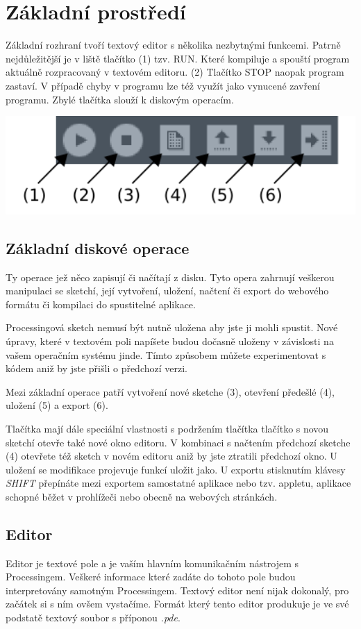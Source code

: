 \documentclass[10pt,twopage]{book}
\newcommand{\oddil}[1]{\section{#1}\label{sec:#1}}
\newcommand{\pododdil}[1]{\subsection{#1}\label{subsec:#1}}
\newcommand{\klavesy}[1]{\textsc{\em #1}}
\begin{document}
\oddil{Základní prostředí}


Základní rozhraní tvoří textový editor s několika nezbytnými funkcemi. Patrně nejdůležitější je v liště tlačítko (1) tzv. RUN. Které kompiluje a spouští program aktuálně rozpracovaný v textovém editoru. (2) Tlačítko STOP naopak program zastaví. V případě chyby v programu lze též využít jako vynucené zavření programu. Zbylé tlačítka slouží k diskovým operacím. \\


\begin{center}
\includegraphics[width = 1\textwidth]{imgs/buttons.png}
\end{center}


\newpage
\pododdil{Základní diskové operace}

Ty operace jež něco zapisují či načítají z disku. Tyto opera zahrnují veškerou manipulaci se sketchí, její vytvoření, uložení, načtení či export do webového formátu či kompilaci do spustitelné aplikace.

Processingová sketch nemusí být nutně uložena aby jste ji mohli spustit. Nové úpravy, které v textovém poli napíšete budou dočasně uloženy v závislosti na vašem operačním systému jinde. Tímto způsobem můžete experimentovat s kódem aniž by jste přišli o předchozí verzi.

Mezi základní operace patří vytvoření nové sketche (3), otevření předešlé (4), uložení (5) a export (6).

Tlačítka mají dále speciální vlastnosti s podržením tlačítka tlačítko s novou sketchí otevře také nové okno editoru. V kombinaci s načtením předchozí sketche (4) otevřete též sketch v novém editoru aniž by jste ztratili předchozí okno. U uložení se modifikace projevuje funkcí uložit jako. U exportu stisknutím klávesy \klavesy{SHIFT} přepínáte mezi exportem samostatné aplikace nebo tzv. appletu, aplikace schopné běžet v prohlížeči nebo obecně na webových stránkách.

\pododdil{Editor}

Editor je textové pole a je vaším hlavním komunikačním nástrojem s Processingem. Veškeré informace které zadáte do tohoto pole budou interpretovány samotným Processingem. Textový editor není nijak dokonalý, pro začátek si s ním ovšem vystačíme. Formát který tento editor produkuje je ve své podstatě textový soubor s příponou {\em *.pde}.
\end{document}
